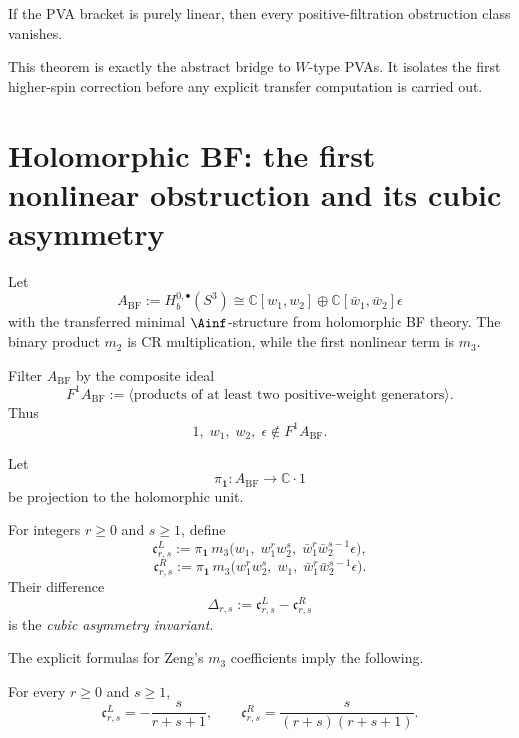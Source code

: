 \begin{corollary}
\label{cor:cbt-current-type-rigidity}
\ClaimStatusProvedHere
If the PVA bracket is purely linear, then every positive-filtration obstruction class vanishes.
\end{corollary}

\begin{remark}
\label{rem:cbt-bridge-to-w-type}
This theorem is exactly the abstract bridge to $W$-type PVAs. It isolates the first higher-spin correction before any explicit transfer computation is carried out.
\end{remark}

\section{Holomorphic BF: the first nonlinear obstruction and its cubic asymmetry}
\label{sec:cbt-holomorphic-bf-obstruction}

Let
\[
A_{\mathrm{BF}}:=H_b^{0,\bullet}(S^3)\cong \mathbb{C}[w_1,w_2]\oplus \mathbb{C}[\bar w_1,\bar w_2]\epsilon
\]
with the transferred minimal $\Ainf$-structure from holomorphic BF theory. The binary product $m_2$ is CR multiplication, while the first nonlinear term is $m_3$.

Filter $A_{\mathrm{BF}}$ by the composite ideal
\[
F^1A_{\mathrm{BF}}:=\langle \text{products of at least two positive-weight generators}\rangle.
\]
Thus
\[
1,\; w_1,\; w_2,\; \epsilon \notin F^1A_{\mathrm{BF}}.
\]

Let
\[
\pi_{\mathbf 1}:A_{\mathrm{BF}}\to \mathbb{C}\cdot 1
\]
be projection to the holomorphic unit.

\begin{definition}
\label{def:cbt-unit-projected-cubic}
For integers $r\ge0$ and $s\ge1$, define
\[
\mathfrak c^L_{r,s}:=
\pi_{\mathbf 1}\,m_3\bigl(w_1,\;w_1^rw_2^s,\;\bar w_1^r\bar w_2^{s-1}\epsilon\bigr),
\]
\[
\mathfrak c^R_{r,s}:=
\pi_{\mathbf 1}\,m_3\bigl(w_1^rw_2^s,\;w_1,\;\bar w_1^r\bar w_2^{s-1}\epsilon\bigr).
\]
Their difference
\[
\Delta_{r,s}:=\mathfrak c^L_{r,s}-\mathfrak c^R_{r,s}
\]
is the \emph{cubic asymmetry invariant}.
\end{definition}

The explicit formulas for Zeng's $m_3$ coefficients imply the following.

\begin{proposition}
\label{prop:cbt-cubic-coeffs}
\ClaimStatusProvedHere
For every $r\ge0$ and $s\ge1$,
\[
\mathfrak c^L_{r,s}=-\frac{s}{r+s+1},
\qquad
\mathfrak c^R_{r,s}=\frac{s}{(r+s)(r+s+1)}.
\]
\end{proposition}

